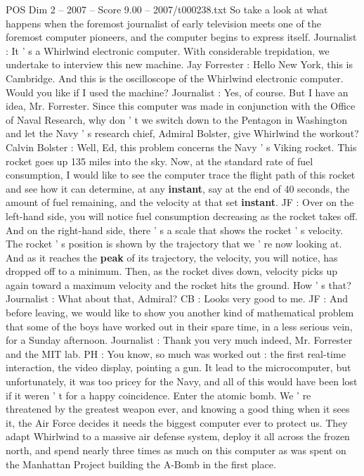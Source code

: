 \begin{textsample}{POS Dim 2 – 2007 – Score 9.00 – 2007/t000238.txt}
So take a look at what happens when the foremost journalist of early television meets one of the foremost computer pioneers, and the computer begins to express itself.
Journalist : It ' s a Whirlwind electronic computer.
With considerable trepidation, we undertake to interview this new machine.
Jay Forrester : Hello New York, this is Cambridge.
And this is the oscilloscope of the Whirlwind electronic computer.
Would you like if I used the machine?
Journalist : Yes, of course.
But I have an idea, Mr.
Forrester.
Since this computer was made in conjunction with the Office of Naval Research, why don ' t we switch down to the Pentagon in Washington and let the Navy ' s research chief, Admiral Bolster, give Whirlwind the workout?
Calvin Bolster : Well, Ed, this problem concerns the Navy ' s Viking rocket.
This rocket goes up 135 miles into the sky.
Now, at the standard rate of fuel consumption, I would like to see the computer trace the flight path of this rocket and see how it can determine, at any \textbf{instant}, say at the end of 40 seconds, the amount of fuel remaining, and the velocity at that set \textbf{instant}.
JF : Over on the left-hand side, you will notice fuel consumption decreasing as the rocket takes off.
And on the right-hand side, there ' s a scale that shows the rocket ' s velocity.
The rocket ' s position is shown by the trajectory that we ' re now looking at.
And as it reaches the \textbf{peak} of its trajectory, the velocity, you will notice, has dropped off to a minimum.
Then, as the rocket dives down, velocity picks up again toward a maximum velocity and the rocket hits the ground.
How ' s that?
Journalist : What about that, Admiral?
CB : Looks very good to me.
JF : And before leaving, we would like to show you another kind of mathematical problem that some of the boys have worked out in their spare time, in a less serious vein, for a Sunday afternoon.
Journalist : Thank you very much indeed, Mr.
Forrester and the MIT lab.
PH : You know, so much was worked out : the first real-time interaction, the video display, pointing a gun.
It lead to the microcomputer, but unfortunately, it was too pricey for the Navy, and all of this would have been lost if it weren ' t for a happy coincidence.
Enter the atomic bomb.
We ' re threatened by the greatest weapon ever, and knowing a good thing when it sees it, the Air Force decides it needs the biggest computer ever to protect us.
They adapt Whirlwind to a massive air defense system, deploy it all across the frozen north, and spend nearly three times as much on this computer as was spent on the Manhattan Project building the A-Bomb in the first place.

\end{textsample}
